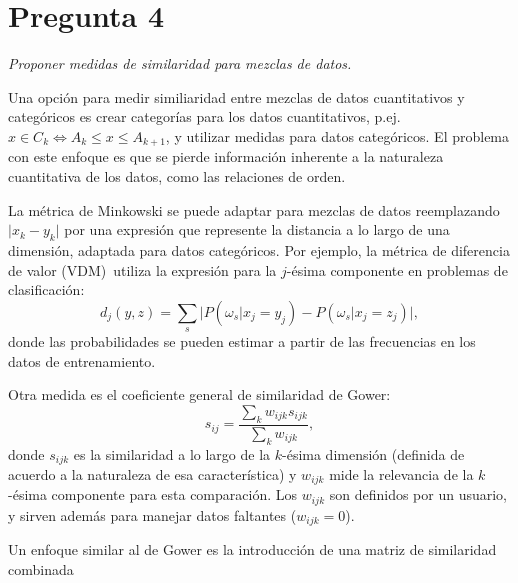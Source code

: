 \documentclass[spanish]{article}
\newcommand{\pregunta}{\textit}
\newcommand{\given}{\vert}
\newcommand{\abs}[1]{\lvert#1\rvert}
\begin{document}
\section*{Pregunta 4}
\pregunta{Proponer medidas de similaridad para mezclas de datos.}

Una opción para medir similiaridad entre mezclas de datos cuantitativos y categóricos es crear
categorías para los datos cuantitativos, p.ej. $x\in C_k\iff A_k\leq x\leq A_{k+1}$, y utilizar
medidas para datos categóricos.  El problema con este enfoque es que se pierde información
inherente a la naturaleza cuantitativa de los datos, como las relaciones de orden.

La métrica de Minkowski se puede adaptar para mezclas de datos reemplazando $\abs{x_k - y_k}$ por
una expresión que represente la distancia a lo largo de una dimensión, adaptada para datos
categóricos.  Por ejemplo, la métrica de diferencia de valor (VDM)~\footnotemark utiliza la
expresión para la $j$-ésima componente en problemas de clasificación:
\begin{equation}
    d_j(y, z) = \sum_{s}\bigl\lvert P(\omega_s\given x_j = y_j) -
                                    P(\omega_s\given x_j = z_j)\bigr\rvert,
\end{equation}
donde las probabilidades se pueden estimar a partir de las frecuencias en los datos de
entrenamiento.

Otra medida es el coeficiente general de similaridad de Gower:
\begin{equation}
   s_{ij} = \frac{\sum_k w_{ijk} s_{ijk}}{\sum_k w_{ijk}},
\end{equation}
donde $s_{ijk}$ es la similaridad a lo largo de la $k$-ésima dimensión (definida
de acuerdo a la naturaleza de esa característica)
y $w_{ijk}$ mide la relevancia de la $k$-ésima componente para esta comparación.
Los $w_{ijk}$ son definidos por un usuario, y sirven además para manejar datos
faltantes ($w_{ijk} = 0$).

Un enfoque similar al de Gower es la introducción de una matriz de similaridad
combinada\footnotemark
{}

%
%
\end{document}
